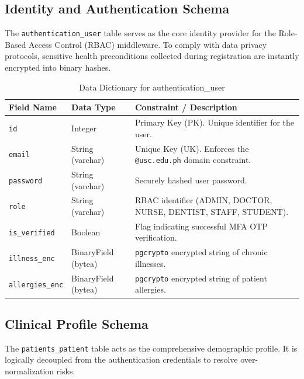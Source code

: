 \subsection{Identity and Authentication Schema}
The \texttt{authentication\_user} table serves as the core identity provider for the Role-Based Access Control (RBAC) middleware. To comply with data privacy protocols, sensitive health preconditions collected during registration are instantly encrypted into binary hashes.

\begin{table}[htbp]
\centering
\caption{Data Dictionary for authentication\_user}
\begin{tabular}{|l|l|p{7cm}|}
\hline
\textbf{Field Name} & \textbf{Data Type} & \textbf{Constraint / Description} \\
\hline
\texttt{id} & Integer & Primary Key (PK). Unique identifier for the user. \\
\hline
\texttt{email} & String (varchar) & Unique Key (UK). Enforces the \texttt{@usc.edu.ph} domain constraint. \\
\hline
\texttt{password} & String (varchar) & Securely hashed user password. \\
\hline
\texttt{role} & String (varchar) & RBAC identifier (ADMIN, DOCTOR, NURSE, DENTIST, STAFF, STUDENT). \\
\hline
\texttt{is\_verified} & Boolean & Flag indicating successful MFA OTP verification. \\
\hline
\texttt{illness\_enc} & BinaryField (bytea) & \texttt{pgcrypto} encrypted string of chronic illnesses. \\
\hline
\texttt{allergies\_enc} & BinaryField (bytea) & \texttt{pgcrypto} encrypted string of patient allergies. \\
\hline
\end{tabular}
\end{table}

\subsection{Clinical Profile Schema}
The \texttt{patients\_patient} table acts as the comprehensive demographic profile. It is logically decoupled from the authentication credentials to resolve over-normalization risks.

